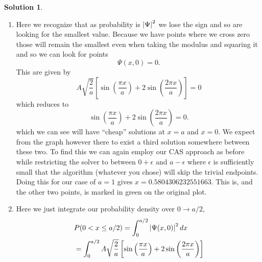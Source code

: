 \documentclass[10pt]{article}
\makeatletter
\theoremstyle{definition}
\newtheorem{soln}{Solution}
\newcommand{\boxspacing}{\kern\kvtcb@left@rule\kern\kvtcb@boxsep}
\newcommand{\prompt}[4]{
    \ttfamily\llap{{\color{#2}[#3]:\hspace{3pt}#4}}\vspace{-\baselineskip}
}
\makeatother
\begin{document}
\begin{soln}
\begin{enumerate}[label=(\alph*)]
\begin{tcolorbox}[breakable, size=fbox, boxrule=1pt, pad at break*=1mm,colback=cellbackground, colframe=cellborder]
\begin{verbatim}
                A = 1/sqrt(5)
                x = var("x")
                eqn = cos(pi*x/a) == -4*cos(2*pi*x/a) #
                show(find_root(eqn, 0, a/2)) # Find roots on [0,a/2] because we need to force finding the maxima on the left rather than the minima on the right
            \end{verbatim}
          \end{tcolorbox}
          \begin{tcolorbox}[breakable, size=fbox, boxrule=.5pt, pad at break*=1mm, opacityfill=0]
            \prompt{Out}{outcolor}{2}{\boxspacing}
            $0.27587156664462037$
          \end{tcolorbox}
          Sadly even sage can't give me a nice analytical solution here (Interestingly, the open access version of Wolfram alpha actually can) so
          we'll have to resign ourselves to using a numerical value that has to be recalculated for new $a$. See blue mark on the plot for
          where this point lies.
    \item Here we recognize that as probability is $\abs{\Psi}^2$ we lose the sign and so are looking for the smallest value. Because we have
          points where we cross zero those will remain the smallest even when taking the modulus and squaring it and so we can look for points
          $$\Psi(x,0)=0.$$
          This are given by
          $$A\sqrt{\frac{2}{a}}\left[\sin\left(\frac{\pi x}{a}\right)+2\sin\left(\frac{2\pi x}{a}\right)\right]=0$$
          which reduces to
          $$\sin\left(\frac{\pi x}{a}\right)+2\sin\left(\frac{2\pi x}{a}\right)=0.$$
          which we can see will have ``cheap'' solutions at $x=a$ and $x=0$. We expect from the graph however there to exist a third solution somewhere between
          these two. To find this we can again employ our CAS approach as before while restricting the solver to between $0+\epsilon$ and $a-\epsilon$ where
          $\epsilon$ is sufficiently small that the algorithm (whatever you chose) will skip the trivial endpoints. Doing this for our case of $a=1$ gives
          $x=0.5804306232551663$. This is, and the other two points, is marked in green on the original plot.
    \item Here we just integrate our probability density over $0\to a/2$,
          \begin{align*}
             & P(0<x\leq a/2)=\int_{0}^{a/2}\abs{\Psi(x,0)}^2\,dx                                                                 \\
             & =\int_{0}^{a/2}A\sqrt{\frac{2}{a}}\left[\sin\left(\frac{\pi x}{a}\right)+2\sin\left(\frac{2\pi x}{a}\right)\right]

\end{align*}
\end{enumerate}
\end{soln}
\end{document}
